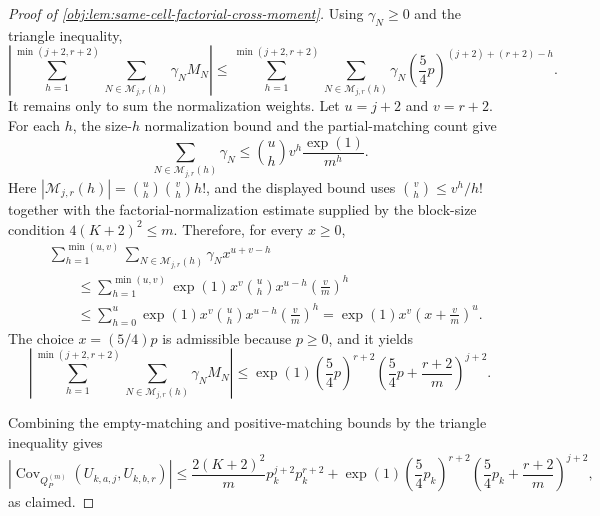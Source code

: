 \begin{proof}[Proof of \cref{obj:lem:same-cell-factorial-cross-moment}]
Using \(\gamma_N\ge0\) and the triangle inequality,
\[
\left|
\sum_{h=1}^{\min(j+2,r+2)}
\sum_{N\in\mathcal M_{j,r}(h)}
\gamma_NM_N
\right|
\le
\sum_{h=1}^{\min(j+2,r+2)}
\sum_{N\in\mathcal M_{j,r}(h)}
\gamma_N
\left(\frac54p\right)^{(j+2)+(r+2)-h}.
\]
It remains only to sum the normalization weights.  Let \(u=j+2\) and \(v=r+2\). For each \(h\), the size-\(h\) normalization bound and the partial-matching count give
\[
\sum_{N\in\mathcal M_{j,r}(h)}\gamma_N
\le
\binom{u}{h}v^h\frac{\exp(1)}{m^h}.
\]
Here \(|\mathcal M_{j,r}(h)|=\binom{u}{h}\binom{v}{h}h!\), and the displayed bound uses \(\binom{v}{h}\le v^h/h!\) together with the factorial-normalization estimate supplied by the block-size condition \(4(K+2)^2\le m\). Therefore, for every \(x\ge0\),
\[
\begin{aligned}
&\sum_{h=1}^{\min(u,v)}
\sum_{N\in\mathcal M_{j,r}(h)}
\gamma_N x^{u+v-h} \\
&\qquad\le
\sum_{h=1}^{\min(u,v)}
\exp(1)x^v\binom{u}{h}x^{u-h}\left(\frac{v}{m}\right)^h \\
&\qquad\le
\sum_{h=0}^{u}
\exp(1)x^v\binom{u}{h}x^{u-h}\left(\frac{v}{m}\right)^h
=
\exp(1)x^v\left(x+\frac{v}{m}\right)^u.
\end{aligned}
\]
The choice \(x=(5/4)p\) is admissible because \(p\ge0\), and it yields
\[
\left|
\sum_{h=1}^{\min(j+2,r+2)}
\sum_{N\in\mathcal M_{j,r}(h)}
\gamma_NM_N
\right|
\le
\exp(1)\left(\frac54p\right)^{r+2}
\left(\frac54p+\frac{r+2}{m}\right)^{j+2}.
\]

Combining the empty-matching and positive-matching bounds by the triangle inequality gives
\[
\left|\operatorname{Cov}_{Q_P^{(m)}}(U_{k,a,j},U_{k,b,r})\right|
\le
\frac{2(K+2)^2}{m}p_k^{j+2}p_k^{r+2}
+
\exp(1)\left(\frac54p_k\right)^{r+2}
\left(\frac54p_k+\frac{r+2}{m}\right)^{j+2},
\]
as claimed.
\end{proof}
